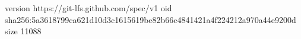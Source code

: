 version https://git-lfs.github.com/spec/v1
oid sha256:5a3618799ca621d10d3c1615619be82b66c4841421a4f224212a970a44e9200d
size 11088
